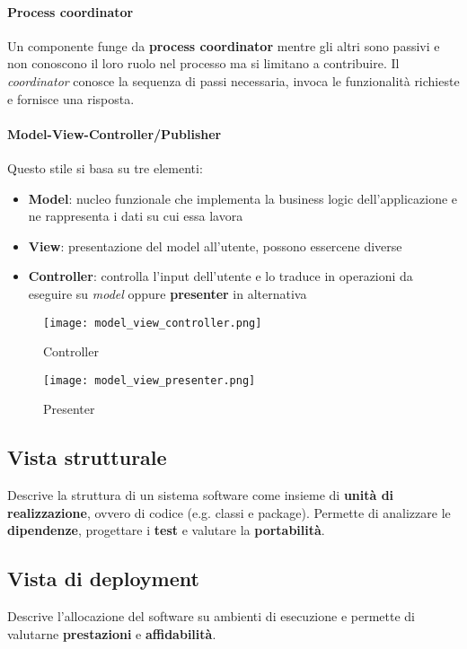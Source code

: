 \paragraph{Process coordinator}
Un componente funge da \textbf{process coordinator} mentre gli altri sono passivi e non conoscono il loro ruolo nel processo ma si limitano a contribuire. Il \textit{coordinator} conosce la sequenza di passi necessaria, invoca le funzionalità richieste e fornisce una risposta.

\newpage
\paragraph{Model-View-Controller/Publisher}
Questo stile si basa su tre elementi:
\begin{itemize}
	\item \textbf{Model}: nucleo funzionale che implementa la business logic dell'applicazione e ne rappresenta i dati su cui essa lavora
	\item \textbf{View}: presentazione del model all'utente, possono essercene diverse
	\item \textbf{Controller}: controlla l'input dell'utente e lo traduce in operazioni da eseguire su \textit{model} oppure \textbf{presenter} in alternativa
\end{itemize}
\begin{figure}[!h]
	\centering
	\begin{minipage}[b]{0.4\textwidth}
		\texttt{[image: model\_view\_controller.png]}
		\caption*{Controller}
	\end{minipage}
	\hspace{10pt}
	\begin{minipage}[b]{0.4\textwidth}
		\texttt{[image: model\_view\_presenter.png]}
		\caption*{Presenter}
	\end{minipage}
\end{figure}

\subsection{Vista strutturale}
Descrive la struttura di un sistema software come insieme di \textbf{unità di realizzazione}, ovvero di codice (e.g. classi e package). Permette di analizzare le \textbf{dipendenze}, progettare i \textbf{test} e valutare la \textbf{portabilità}.

\subsection{Vista di deployment}
Descrive l'allocazione del software su ambienti di esecuzione e permette di valutarne \textbf{prestazioni} e \textbf{affidabilità}.